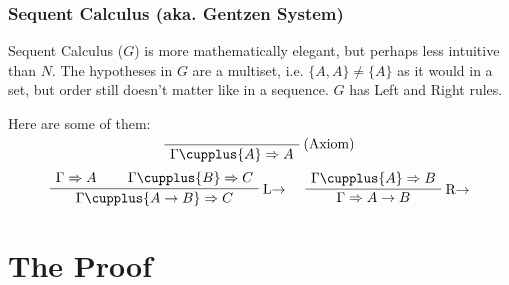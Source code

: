 \documentclass[english,svgnames,hide notes,12pt]{beamer}
\theoremstyle{definition}
\theoremstyle{remark}
\newtheorem{notn}{Notation}
\begin{document}
\begin{frame}
    \frametitle{Sequent Calculus (aka. Gentzen System)}
    Sequent Calculus ($G$) is more mathematically elegant, but perhaps less intuitive than $N$. The hypotheses in $G$ are a multiset, i.e. $\{A,A\}\neq\{A\}$ as it would in a set, but order still doesn't matter like in a sequence. $G$ has Left and Right rules.

    Here are some of them:
    \[
        \AxiomC{}
        \RightLabel{(Axiom)}
        \UnaryInfC{$\Gamma \cupplus \{A\}\Rightarrow A$}
        \DisplayProof
    \]
    \[
        \AxiomC{$\Gamma\Rightarrow A$}
        \AxiomC{$\Gamma\cupplus\{B\}\Rightarrow C$}
        \RightLabel{L$\to$}
        \BinaryInfC{$\Gamma\cupplus\{A\to B\}\Rightarrow C$}
        \DisplayProof
        \hspace{0.5cm}
        \AxiomC{$\Gamma\cupplus\{A\}\Rightarrow B$}
        \RightLabel{R$\to$}
        \UnaryInfC{$\Gamma\Rightarrow A\to B$}
        \DisplayProof
    \]
\end{frame}


\section{The Proof}
\end{document}
